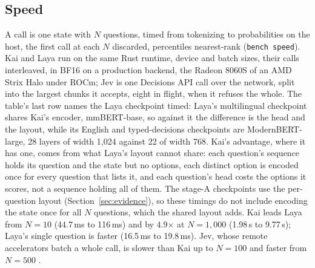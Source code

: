 \begin{table}[tbp]
\centering
\small
\setlength{\tabcolsep}{4pt}

\caption{Capabilities, Kai against Laya and Jev: cardinality, joint coherence,
invariance, media, conformal sets, refresh and offline operation. Written by
\texttt{bench tex}; the last row names the revisions.}
\label{tab:capability}
\end{table}

\subsection{Speed}
\label{sec:speed}

A call is one state with $N$ questions, timed from tokenizing to probabilities
on the host, the first call at each $N$ discarded, percentiles nearest-rank
(\texttt{bench speed}). Kai and Laya run on the same Rust runtime, device and
batch sizes, their calls interleaved, in BF16 on a production backend, the
Radeon 8060S of an AMD Strix Halo under ROCm; Jev is one Decisions API call over
the network, split into the largest chunks it accepts,
eight in flight, when it refuses the whole. The table's last row names the Laya
checkpoint timed: Laya's multilingual checkpoint shares Kai's encoder,
mmBERT-base, so against it the difference is the head and the layout, while its
English and typed-decisions checkpoints are ModernBERT-large, 28 layers of width
1{,}024 against 22 of width 768. Kai's advantage, where it has one, comes from what
Laya's layout cannot share: each question's sequence holds its question and the
state but no options, each distinct option is encoded once for every question
that lists it, and each question's head costs the options it scores, not a
sequence holding all of them. The stage-A checkpoints use the per-question
layout (Section~\ref{sec:evidence}), so these timings do not include encoding
the state once for all $N$ questions, which the shared layout adds. Kai
leads Laya from $N = 10$ (44.7\,ms to 116\,ms) and by 4.9$\times$ at $N =
1{,}000$ (1.98\,s to 9.77\,s); Laya's single question is faster (16.5\,ms to
19.8\,ms). Jev, whose remote accelerators batch a whole call, is slower than
Kai up to $N = 100$ and faster from $N = 500$ \meas.

\begin{table}[tbp]
\centering
\small
\setlength{\tabcolsep}{4pt}

\caption{Latency per call (ms, p50 and p95) and questions per second, by
questions per state, on each production backend timed. Written by
\texttt{bench tex}; the last row names the machine and revisions.}
\label{tab:speed}
\end{table}

\clearpage

